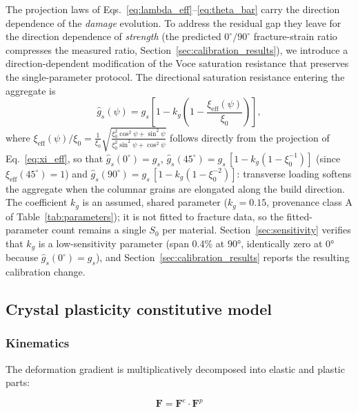 The projection laws of Eqs.~\eqref{eq:lambda_eff}--\eqref{eq:theta_bar} carry the direction dependence of the \emph{damage} evolution. To address the residual gap they leave for the direction dependence of \emph{strength} (the predicted $0^\circ/90^\circ$ fracture-strain ratio compresses the measured ratio, Section~\ref{sec:calibration_results}), we introduce a direction-dependent modification of the Voce saturation resistance that preserves the single-parameter protocol. The directional saturation resistance entering the aggregate is
\begin{equation}
\hat{g}_s(\psi) = g_s \left[1 - k_g \left(1 - \frac{\xi_{\mathrm{eff}}(\psi)}{\xi_0}\right)\right],
\label{eq:gs_directional}
\end{equation}
where $\xi_{\mathrm{eff}}(\psi)/\xi_0 = \frac{1}{\xi_0}\sqrt{\frac{\xi_0^2\cos^2\psi + \sin^2\psi}{\xi_0^2\sin^2\psi + \cos^2\psi}}$ follows directly from the projection of Eq.~\eqref{eq:xi_eff}, so that $\hat{g}_s(0^\circ) = g_s$, $\hat{g}_s(45^\circ) = g_s\,[1 - k_g(1 - \xi_0^{-1})]$ (since $\xi_{\mathrm{eff}}(45^\circ) = 1$) and $\hat{g}_s(90^\circ) = g_s\,[1 - k_g(1 - \xi_0^{-2})]$: transverse loading softens the aggregate when the columnar grains are elongated along the build direction. The coefficient $k_g$ is an assumed, shared parameter ($k_g = 0.15$, provenance class A of Table~\ref{tab:parameters}); it is not fitted to fracture data, so the fitted-parameter count remains a single $S_0$ per material. Section~\ref{sec:sensitivity} verifies that $k_g$ is a low-sensitivity parameter (span 0.4\% at $\ang{90}$, identically zero at $\ang{0}$ because $\hat{g}_s(0^\circ)=g_s$), and Section~\ref{sec:calibration_results} reports the resulting calibration change.

\subsection{Crystal plasticity constitutive model}
\label{sec:cp_model}

\subsubsection{Kinematics}

The deformation gradient is multiplicatively decomposed into elastic and plastic parts:

\begin{equation}
\mathbf{F} = \mathbf{F}^e \cdot \mathbf{F}^p
\label{eq:F_decomposition}
\end{equation}

